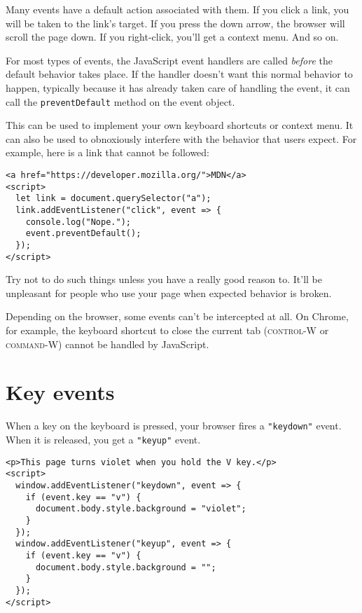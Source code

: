 Many events have a default action associated with them. If you click a link, you will be taken to the link's target. If you press the down arrow, the browser will scroll the page down. If you right-click, you'll get a context menu. And so on.

For most types of events, the JavaScript event handlers are called \emph{before} the default behavior takes place. If the handler doesn't want this normal behavior to happen, typically because it has already taken care of handling the event, it can call the \lstinline`preventDefault` method on the event object.

This can be used to implement your own keyboard shortcuts or context menu. It can also be used to obnoxiously interfere with the behavior that users expect. For example, here is a link that cannot be followed:

\begin{lstlisting}
<a href="https://developer.mozilla.org/">MDN</a>
<script>
  let link = document.querySelector("a");
  link.addEventListener("click", event => {
    console.log("Nope.");
    event.preventDefault();
  });
</script>
\end{lstlisting}
\noindent{}

Try not to do such things unless you have a really good reason to. It'll be unpleasant for people who use your page when expected behavior is broken.

Depending on the browser, some events can't be intercepted at all. On Chrome, for example, the keyboard shortcut to close the current tab (\textsc{control}-W or \textsc{command}-W) cannot be handled by JavaScript.

\section{Key events}

When a key on the keyboard is pressed, your browser fires a \lstinline`"keydown"` event. When it is released, you get a \lstinline`"keyup"` event.

\begin{lstlisting}
<p>This page turns violet when you hold the V key.</p>
<script>
  window.addEventListener("keydown", event => {
    if (event.key == "v") {
      document.body.style.background = "violet";
    }
  });
  window.addEventListener("keyup", event => {
    if (event.key == "v") {
      document.body.style.background = "";
    }
  });
</script>
\end{lstlisting}
\noindent{}

